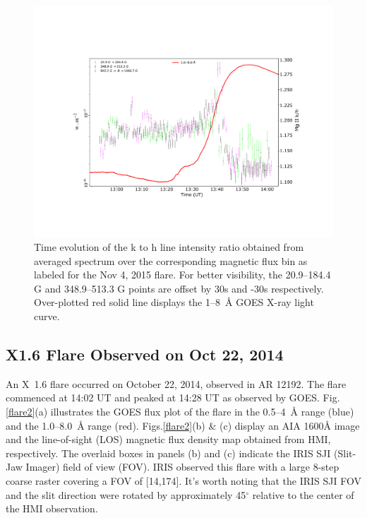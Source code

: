 \begin{figure}[ht!]
    \centering
    \includegraphics[trim={3cm 3cm 2cm 4cm},clip,width=\textwidth]{Figures/Nov-11-2015-optical-dep-ev-5.pdf}
    \caption{Time evolution of the   k to h line intensity ratio obtained from averaged spectrum over the corresponding magnetic flux bin as labeled for the Nov 4, 2015 flare. For better visibility, the 20.9{--}184.4 G and 348.9{--}513.3 G points are offset by 30s and -30s respectively. Over-plotted red solid line displays the 1{--}8~{\AA} GOES X-ray light curve.}
    \label{fig:optical_dep_ev_m}
\end{figure}

\subsection{X1.6 Flare Observed on Oct 22, 2014}

An X~1.6 flare occurred on October 22, 2014, observed in AR 12192. The flare commenced at 14:02 UT and peaked at 14:28 UT as observed by GOES. Fig.\ref{flare2}(a) illustrates the GOES flux plot of the flare in the 0.5{--}4~{\AA} range (blue) and the 1.0{--}8.0~{\AA} range (red). Figs.\ref{flare2}(b) \& (c) display an AIA 1600{\AA} image and the line-of-sight (LOS) magnetic flux density map obtained from HMI, respectively. The overlaid boxes in panels (b) and (c) indicate the IRIS SJI (Slit-Jaw Imager) field of view (FOV). IRIS observed this flare with a large 8-step coarse raster covering a FOV of [14\arcsec,174\arcsec]. It's worth noting that the IRIS SJI FOV and the slit direction were rotated by approximately 45$^\circ$ relative to the center of the HMI observation.

